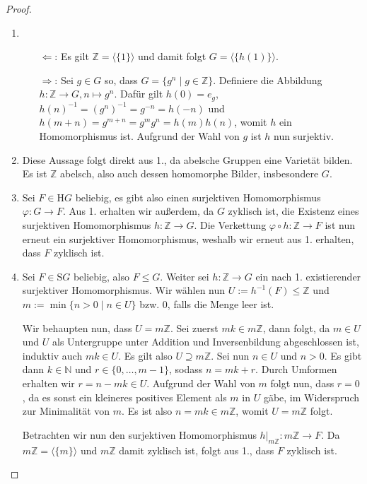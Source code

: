\begin{proof} {\ }
    \begin{enumerate}
        \item \begin{itemize}
            \item[$\Leftarrow$:] Es gilt $\mathbb{Z}=\langle \{1\} \rangle$ und damit folgt $G=\langle \{h(1)\} \rangle$.
            \item[$\Rightarrow$:] Sei $g \in G$ so, dass $G = \{g^n \mid g \in \mathbb{Z}\} $. Definiere die Abbildung $h: \mathbb{Z} \to G, n \mapsto g^n$. Dafür gilt $h(0) = e_g$, $h(n)^{-1} = (g^{n})^{-1} = g^{-n} = h(-n)$ und $h(m+n) = g^{m+n} = g^m g^n = h(m)h(n)$, womit $h$ ein Homomorphismus ist. Aufgrund der Wahl von $g$ ist $h$ nun surjektiv.
        \end{itemize}
        \item Diese Aussage folgt direkt aus 1., da abelsche Gruppen eine Varietät bilden. Es ist $\mathbb{Z}$ abelsch, also auch dessen homomorphe Bilder, insbesondere $G$.
        \item Sei $F \in \mathrm{H}G$ beliebig, es gibt also einen surjektiven Homomorphismus $\varphi: G \to F$. Aus 1. erhalten wir außerdem, da $G$ zyklisch ist, die Existenz eines surjektiven Homomorphismus $h: \mathbb{Z} \to G$. Die Verkettung $\varphi \circ h: \mathbb{Z} \to F$ ist nun erneut ein surjektiver Homomorphismus, weshalb wir erneut aus 1. erhalten, dass $F$ zyklisch ist.
        \item Sei $F \in \mathrm{S}G$ beliebig, also $F \le G$. Weiter sei $h: \mathbb{Z} \to G$ ein nach 1. existierender surjektiver Homomorphismus.
        Wir wählen nun $U := h^{-1}(F) \le \mathbb{Z}$ und $m := \min\{n > 0 \mid n \in U\}$ bzw. $0$, falls die Menge leer ist. 
        
        Wir behaupten nun, dass $U = m \mathbb{Z}$. Sei zuerst $mk \in m\mathbb{Z}$, dann folgt, da $m \in U$ und $U$ als Untergruppe unter Addition und Inversenbildung abgeschlossen ist, induktiv auch $mk \in U$. Es gilt also $U \supseteq m\mathbb{Z}$. Sei nun $n \in U$ und \obda $n > 0$. Es gibt dann $k \in \mathbb{N}$ und $r \in \{0, \ldots, m-1\}$, sodass $n = mk+r$. Durch Umformen erhalten wir $r = n - mk \in U$. Aufgrund der Wahl von $m$ folgt nun, dass $r = 0$, da es sonst ein kleineres positives Element als $m$ in $U$ gäbe, im Widerspruch zur Minimalität von $m$. Es ist also $n = mk \in m\mathbb{Z}$, womit $U = m\mathbb{Z}$ folgt.

        Betrachten wir nun den surjektiven Homomorphismus $h\vert_{m\mathbb{Z}}: m\mathbb{Z} \to F$. Da $m\mathbb{Z} = \langle\{m\}\rangle$ und $m\mathbb{Z}$ damit zyklisch ist, folgt aus 1., dass $F$ zyklisch ist.
    \end{enumerate}
\end{proof}

